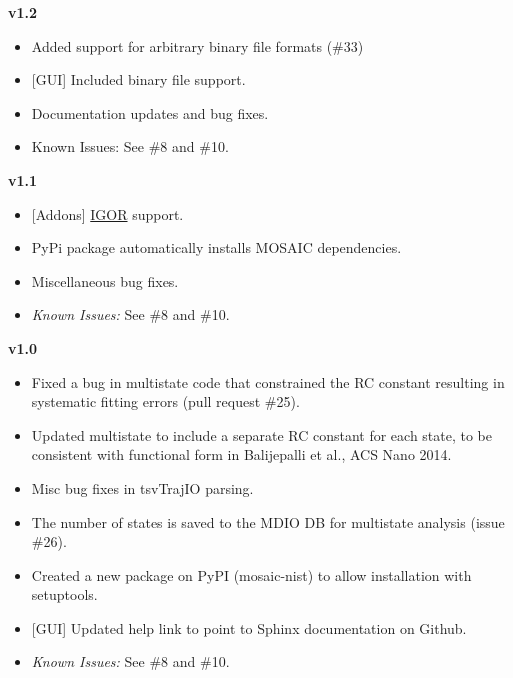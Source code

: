 \documentclass[letterpaper,10pt,english]{sphinxmanual}
\begin{document}
\textbf{v1.2}
\begin{itemize}
\item {} 
Added support for arbitrary binary file formats (\#33)

\item {} 
{[}GUI{]} Included binary file support.

\item {} 
Documentation updates and bug fixes.

\item {} 
Known Issues: See \#8 and \#10.

\end{itemize}

\textbf{v1.1}
\begin{itemize}
\item {} 
{[}Addons{]} \href{http://www.wavemetrics.com/products/igorpro/igorpro.htm}{IGOR} support.

\item {} 
PyPi package automatically installs MOSAIC dependencies.

\item {} 
Miscellaneous bug fixes.

\item {} 
\emph{Known Issues:} See \#8 and \#10.

\end{itemize}

\textbf{v1.0}
\begin{itemize}
\item {} 
Fixed a bug in multistate code that constrained the RC constant resulting in systematic fitting errors (pull request \#25).

\item {} 
Updated multistate to include a separate RC constant for each state, to be consistent with functional form in Balijepalli et al., ACS Nano 2014.

\item {} 
Misc bug fixes in tsvTrajIO parsing.

\item {} 
The number of states is saved to the MDIO DB for multistate analysis (issue \#26).

\item {} 
Created a new package on PyPI (mosaic-nist) to allow installation with setuptools.

\item {} 
{[}GUI{]} Updated help link to point to Sphinx documentation on Github.

\item {} 
\emph{Known Issues:} See \#8 and \#10.

\end{itemize}
\end{document}
